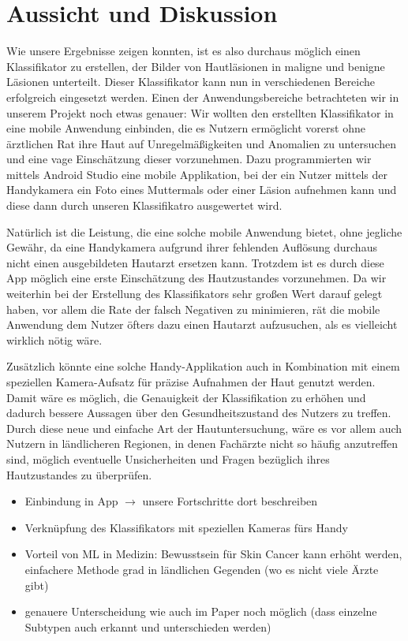 \section{Aussicht und Diskussion}

Wie unsere Ergebnisse zeigen konnten, ist es also durchaus möglich einen Klassifikator zu erstellen, der Bilder von Hautläsionen in maligne und benigne Läsionen unterteilt. Dieser Klassifikator kann nun in verschiedenen Bereiche erfolgreich eingesetzt werden. Einen der Anwendungsbereiche betrachteten wir in unserem Projekt noch etwas genauer: Wir wollten den erstellten Klassifikator in eine mobile Anwendung einbinden, die es Nutzern ermöglicht vorerst ohne ärztlichen Rat ihre Haut auf Unregelmäßigkeiten und Anomalien zu untersuchen und eine vage Einschätzung dieser vorzunehmen. Dazu programmierten wir mittels Android Studio eine mobile Applikation, bei der ein Nutzer mittels der Handykamera ein Foto eines Muttermals oder einer Läsion aufnehmen kann und diese dann durch unseren Klassifikatro ausgewertet wird. 

Natürlich ist die Leistung, die eine solche mobile Anwendung bietet, ohne jegliche Gewähr, da eine Handykamera aufgrund ihrer fehlenden Auflösung durchaus nicht einen ausgebildeten Hautarzt ersetzen kann. Trotzdem ist es durch diese App möglich eine erste Einschätzung des Hautzustandes vorzunehmen. Da wir weiterhin bei der Erstellung des Klassifikators sehr großen Wert darauf gelegt haben, vor allem die Rate der falsch Negativen zu minimieren, rät die mobile Anwendung dem Nutzer öfters dazu einen Hautarzt aufzusuchen, als es vielleicht wirklich nötig wäre. 

Zusätzlich könnte eine solche Handy-Applikation auch in Kombination mit einem speziellen Kamera-Aufsatz für präzise Aufnahmen der Haut genutzt werden. Damit wäre es möglich, die Genauigkeit der Klassifikation zu erhöhen und dadurch bessere Aussagen über den Gesundheitszustand des Nutzers zu treffen. Durch diese neue und einfache Art der Hautuntersuchung, wäre es vor allem auch Nutzern in ländlicheren Regionen, in denen Fachärzte nicht so häufig anzutreffen sind, möglich eventuelle Unsicherheiten und Fragen bezüglich ihres Hautzustandes zu überprüfen. 

\begin{itemize}
	\item Einbindung in App $\rightarrow$ unsere Fortschritte dort beschreiben
	\item Verknüpfung des Klassifikators mit speziellen Kameras fürs Handy
	\item Vorteil von ML in Medizin: Bewusstsein für Skin Cancer kann erhöht werden, einfachere Methode grad in ländlichen Gegenden (wo es nicht viele Ärzte gibt)
	\item genauere Unterscheidung wie auch im Paper noch möglich (dass einzelne Subtypen auch erkannt und unterschieden werden)

\end{itemize}